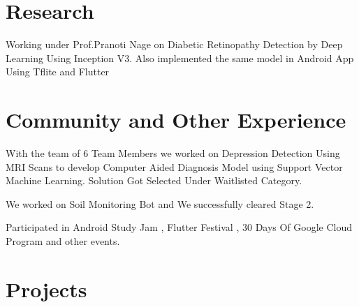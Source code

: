 \documentclass[]{deedy-resume-openfont}
\begin{document}
\begin{minipage}[t]{0.66\textwidth}
\section{Research}
Working under Prof.Pranoti Nage on Diabetic Retinopathy Detection by Deep Learning Using Inception V3. Also implemented the same model in Android App Using Tflite and Flutter
\sectionsep




\section{Community and Other Experience}
With the team of 6 Team Members we worked on Depression Detection Using MRI Scans to develop Computer Aided Diagnosis Model using Support Vector Machine Learning.  Solution Got Selected Under Waitlisted Category. 
\sectionsep

We worked on Soil Monitoring Bot and We successfully cleared Stage 2.  
\sectionsep
 
\sectionsep

Participated in Android Study Jam , Flutter Festival , 30 Days Of Google Cloud Program and other events.
\sectionsep


\section{Projects} 


\end{minipage}
\end{document}
